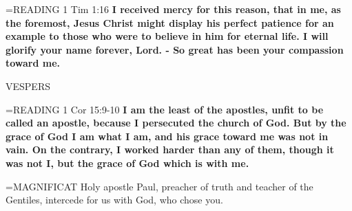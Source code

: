 \hangindent=\parindent \small{READING} 1 Tim 1:16 \textbf{I received mercy for this reason, that in me, as
the foremost, Jesus Christ might display his perfect patience for an
example to those who were to believe in him for eternal life.
I will glorify your name forever, Lord.
- So great has been your compassion toward me.}
 
\begin{flushleft}\normalsize VESPERS\\\end{flushleft}

\hangindent=\parindent \small{READING} 1 Cor 15:9-10 \textbf{I am the least of the apostles, unfit to be called
an apostle, because I persecuted the church of God. But by the
grace of God I am what I am, and his grace toward me was not in
vain. On the contrary, I worked harder than any of them, though it
was not I, but the grace of God which is with me.\\}
 
\hangindent=\parindent \small{MAGNIFICAT  Holy apostle Paul, preacher of truth and teacher of the
Gentiles, intercede for us with God, who chose you.\\}
 
 

